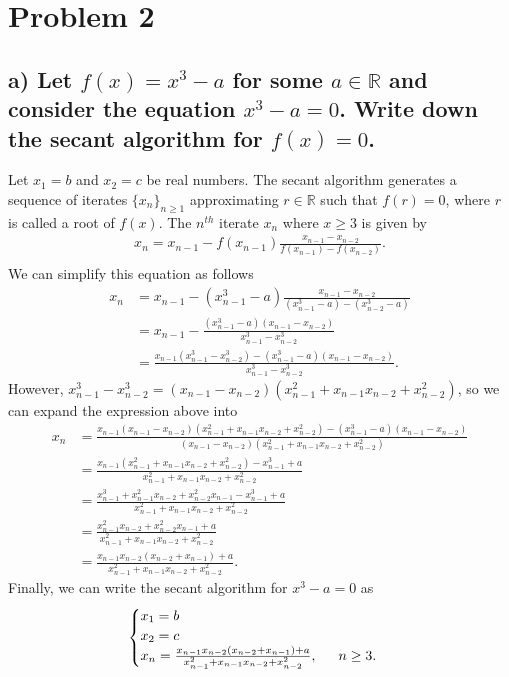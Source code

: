 \documentclass[11pt, letterpaper]{article}
\begin{document}
\section*{Problem 2}
\subsection*{a) \normalfont Let $f(x)=x^3-a$ for some $a\in\mathbb{R}$ and consider the equation $x^3-a=0$. 
Write down the secant algorithm for $f(x)=0$.}
Let $x_1=b$ and $x_2=c$ be real numbers. The secant algorithm generates a sequence of iterates $\{x_n\}_{n\geq1}$
approximating $r\in\mathbb{R}$ such that $f(r)=0$, where $r$ is called a root of $f(x)$. The $n^{th}$ iterate $x_n$
where $x \geq 3$ is given by
\begin{align*}
    x_n=x_{n-1}-f(x_{n-1})\frac{x_{n-1}-x_{n-2}}{f(x_{n-1})-f(x_{n-2})}.\\
\end{align*}
We can simplify this equation as follows
\begin{align*}
    x_n&=x_{n-1}-(x_{n-1}^3-a)\frac{x_{n-1} - x_{n-2}}{(x_{n-1}^3-a) - (x_{n-2}^3-a)}\\
    &=x_{n-1}-\frac{(x_{n-1}^3-a)(x_{n-1} - x_{n-2})}{x_{n-1}^3 - x_{n-2}^3}\\
    &=\frac{x_{n-1}(x_{n-1}^3-x_{n-2}^3) - (x_{n-1}^3-a)(x_{n-1} - x_{n-2})}{x_{n-1}^3 - x_{n-2}^3}.
\end{align*}
However, $x_{n-1}^3-x_{n-2}^3=(x_{n-1}-x_{n-2})(x_{n-1}^2+x_{n-1}x_{n-2}+x_{n-2}^2)$, so we can expand
the expression above into
\begin{align*}
    x_n&=\frac{x_{n-1}(x_{n-1}-x_{n-2})(x_{n-1}^2+x_{n-1}x_{n-2}+x_{n-2}^2)-(x_{n-1}^3-a)(x_{n-1}-x_{n-2})}{(x_{n-1}-x_{n-2})(x_{n-1}^2+x_{n-1}x_{n-2}+x_{n-2}^2)}\\
    &=\frac{x_{n-1}(x_{n-1}^2+x_{n-1}x_{n-2}+x_{n-2}^2)-x_{n-1}^3+a}{x_{n-1}^2+x_{n-1}x_{n-2}+x_{n-2}^2}\\
    &=\frac{x_{n-1}^3+x_{n-1}^2x_{n-2}+x_{n-2}^2x_{n-1}-x_{n-1}^3+a}{x_{n-1}^2+x_{n-1}x_{n-2}+x_{n-2}^2}\\
    &=\frac{x_{n-1}^2x_{n-2}+x_{n-2}^2x_{n-1}+a}{x_{n-1}^2+x_{n-1}x_{n-2}+x_{n-2}^2}\\
    &=\frac{x_{n-1}x_{n-2}(x_{n-2}+x_{n-1})+a}{x_{n-1}^2+x_{n-1}x_{n-2}+x_{n-2}^2}.
\end{align*}
Finally, we can write the secant algorithm for $x^3-a=0$ as\\
\begin{align*}
    \begin{cases}
        x_1=b\\
        x_2=c\\
        x_n=\frac{x_{n-1}x_{n-2}(x_{n-2}+x_{n-1})+a}{x_{n-1}^2+x_{n-1}x_{n-2}+x_{n-2}^2},\text{\indent $n\geq 3$}.
    \end{cases}
\end{align*}
\newpage
\end{document}
